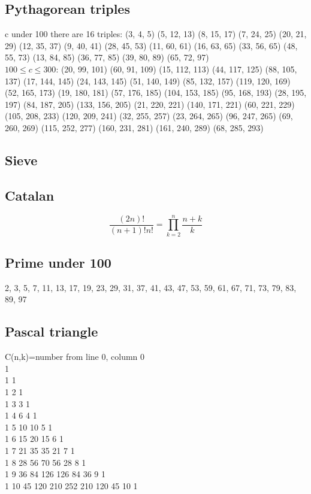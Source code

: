 \documentclass[A4 paper, 12pt, oneside]{article}
\begin{document}
\begin{landscape}
\begin{multicols}{2}
	\subsection{Pythagorean triples}
	c under 100 there are 16 triples:
	(3, 4, 5)	(5, 12, 13)	(8, 15, 17)	(7, 24, 25)
(20, 21, 29)	(12, 35, 37)	(9, 40, 41)	(28, 45, 53)
(11, 60, 61)	(16, 63, 65)	(33, 56, 65)	(48, 55, 73)
(13, 84, 85)	(36, 77, 85)	(39, 80, 89)	(65, 72, 97) \\

	$100 \leq c \leq 300$:
	(20, 99, 101)	(60, 91, 109)	(15, 112, 113)	(44, 117, 125)
(88, 105, 137)	(17, 144, 145)	(24, 143, 145)	(51, 140, 149)
(85, 132, 157)	(119, 120, 169)	(52, 165, 173)	(19, 180, 181)
(57, 176, 185)	(104, 153, 185)	(95, 168, 193)	(28, 195, 197)
(84, 187, 205)	(133, 156, 205)	(21, 220, 221)	(140, 171, 221)
(60, 221, 229)	(105, 208, 233)	(120, 209, 241)	(32, 255, 257)
(23, 264, 265)	(96, 247, 265)	(69, 260, 269)	(115, 252, 277)
(160, 231, 281)	(161, 240, 289)	(68, 285, 293)

	\subsection{Sieve}
	

	\subsection{Catalan}
	\[\frac{(2n)!}{(n + 1)!n!} = \prod_{k = 2}^n \frac{n + k}{k} \]

	\subsection{Prime under 100}
	2, 3, 5, 7, 11, 13, 17, 19, 23, 29, 31, 37, 41, 43, 47, 53, 59, 61, 67, 71, 73, 79, 83, 89, 97 
	\subsection{Pascal triangle}
C(n,k)=number from line 0, column 0\\
1\\
1 1\\
1 2 1\\ 
1 3 3 1\\ 
1 4 6 4 1\\ 
1 5 10 10 5 1\\ 
1 6 15 20 15 6 1\\ 
1 7 21 35 35 21 7 1\\
1 8 28 56 70 56 28 8 1\\ 
1 9 36 84 126 126 84 36 9 1\\
1 10 45 120 210 252 210 120 45 10 1

\end{multicols}
\end{landscape}
\end{document}
